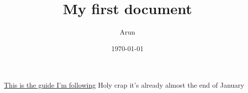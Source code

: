 \documentclass{article}
\title{My first document}
\date{\today}
\author{Arun}
\begin{document}
  \maketitle
  \newpage
  \href{https://www.latex-tutorial.com/tutorials/first-document/}{This is the guide I'm following}
  \newpage
  Holy crap it's already almost the end of January
\end{document}
